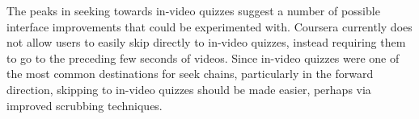 \documentclass{sigchi}
\begin{document}


The peaks in seeking towards in-video quizzes suggest a number of possible interface improvements that could be experimented with. Coursera currently does not allow users to easily skip directly to in-video quizzes, instead requiring them to go to the preceding few seconds of videos. Since in-video quizzes were one of the most common destinations for seek chains, particularly in the forward direction, skipping to in-video quizzes should be made easier, perhaps via improved scrubbing techniques. %


\end{document}
